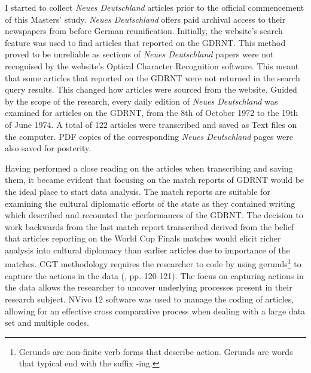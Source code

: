 I started to collect \textit{Neues Deutschland} articles prior to the official commencement of this Masters’ study. \textit{Neues Deutschland} offers paid archival access to their newspapers from before German reunification. Initially, the website’s search feature was used to find articles that reported on the GDRNT. This method proved to be unreliable as sections of \textit{Neues Deutschland} papers were not recognised by the website’s Optical Character Recognition software. This meant that some articles that reported on the GDRNT were not returned in the search query results. This changed how articles were sourced from the website. Guided by the scope of the research, every daily edition of \textit{Neues Deutschland} was examined for articles on the GDRNT, from the 8th of October 1972 to the 19th of June 1974. A total of 122 articles were transcribed and saved as Text files on the computer. PDF copies of the corresponding \textit{Neues Deutschland} pages were also saved for posterity.

Having performed a close reading on the articles when transcribing and saving them, it became evident that focusing on the match reports of GDRNT would be the ideal place to start data analysis. The match reports are suitable for examining the cultural diplomatic efforts of the state as they contained writing which described and recounted the performances of the GDRNT. The decision to work backwards from the last match report transcribed derived from the belief that articles reporting on the World Cup Finals matches would elicit richer analysis into cultural diplomacy than earlier articles due to importance of the matches. CGT methodology requires the researcher to code by using gerunds\footnote{Gerunds are non-finite verb forms that describe action. Gerunds are words that typical end with the suffix -ing.} to capture the actions in the data (\cite{charmaz2014}, pp. 120-121). The focus on capturing actions in the data allows the researcher to uncover underlying processes present in their research subject. NVivo 12 software was used to manage the coding of articles, allowing for an effective cross comparative process when dealing with a large data set and multiple codes.

